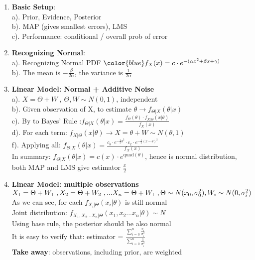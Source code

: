 \documentclass[10pt,landscape]{article}
\begin{document}
\begin{multicols}{3}
\begin{enumerate}
						
	\item \textbf{Basic Setup}: \\
			a). Prior, Evidence, Posterior\\
			b). MAP (gives smallest errors), LMS\\
			c). Performance: conditional / overall prob of error\\
			
	\item \textbf{Recognizing Normal}: \\
			a). Recognizing 	Normal PDF $\color{blue} f_X(x) = c\cdot e^{-(\alpha x^2 + \beta x + \gamma)}$\\
			b). The mean is $-\frac{\beta}{2\alpha}$, the variance is $\frac{1}{2\alpha}$ \\
			
	\item \textbf{Linear Model: Normal + Additive Noise}\\
			a). $X = \Theta + W\ ,\  \Theta, W\sim N(0,1)$, independent\\
			b). Given observation of X, to estimate $\theta \rightarrow f_{\Theta|X}(\theta|x)$\\
			c). By to Bayes' Rule :$f_{\Theta|X}(\theta|x) = \frac{f_\Theta(\theta)\cdot f_{X|\Theta}(x|\theta)}{f_X(x)}$\\
			d). For each term: $f_{X|\Theta}(x|\theta) \rightarrow X = \theta + W \sim N(\theta,1)$\\
			f). Applying all: $f_{\Theta|X}(\theta|x) = \frac{c_\theta \cdot e^{-\frac{1}{2}\theta^2} \cdot c_x\cdot e^{-\frac{1}{2	}(x-\theta)^2}}{f_X(x)}$\\
			
			In summary: $f_{\Theta|X}(\theta|x) = c(x)\cdot e^{\text{quad}(\theta)}$, hence is normal distribution, both MAP and LMS give estimator $\frac{x}{2}$ \\
			
	\item \textbf{Linear Model: multiple observations}\\
			$X_1 = \Theta + W_1\ ,\\
			X_2 = \Theta + W_2\ ,\\
			...\\
			X_n = \Theta + W_1\ , \Theta \sim	N(x_0, \sigma_0^2), W_i \sim N(0, \sigma_i^2)
			$\\
			
			As we can see, for each $f_{X_i|\Theta}(x_i|\theta)$ is still normal\\
			Joint distribution: $f_{X_1, X_2 ... X_n|\Theta}(x_1, x_2 ... x_n|\theta)\sim N$ \\
			Using base rule, the posterior should be also normal\\
			It is easy to verify that: estimator = $\frac{\sum_{i=0}^n \frac{x_i}{\sigma_i^2}}{\sum_{i=0}^n \frac{1}{\sigma_i^2}}$\\
			\textbf{Take away}: observations, including prior, are weighted\\
			

\end{enumerate}
\end{multicols}
\end{document}
